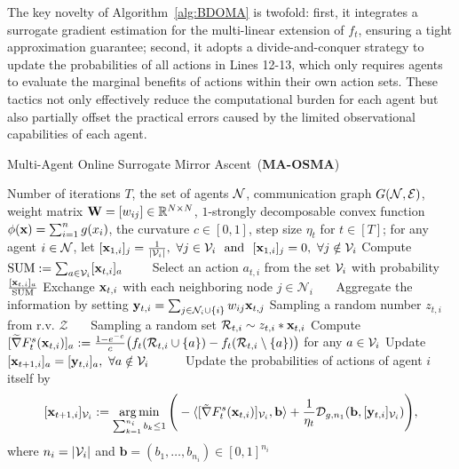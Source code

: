     The key novelty of Algorithm~\ref{alg:BDOMA} is twofold: first, it integrates a surrogate gradient estimation for the multi-linear extension of $f_{t}$, ensuring a tight approximation guarantee; second, it adopts a divide-and-conquer strategy to update the probabilities of all actions in Lines 12-13, which only requires agents to evaluate the marginal benefits of actions within their own action sets. These tactics not only effectively reduce the computational burden for each agent but also partially offset the practical errors caused by the limited observational capabilities of each agent.
     \begin{algorithm}[t]
		\caption{Multi-Agent Online Surrogate Mirror Ascent~(\textbf{MA-OSMA})}\label{alg:BDOMA}
		\begin{algorithmic}[1]
			 Number of iterations $T$, the set of agents $\mathcal{N}$, communication graph $G(\mathcal{N},\mathcal{E})$,
			weight matrix $\mathbf{W}=[w_{ij}]\in\mathbb{R}^{N\times N}$, $1$-strongly decomposable convex function $\phi(\mathbf{x})=\sum_{i=1}^{n}g(x_{i})$, the curvature $c\in[0,1]$, step size $\eta_{t}$ for $t\in[T]$;
			 for any agent $i\in\mathcal{N}$, let $[\mathbf{x}_{1,i}]_{j}=\frac{1}{|\mathcal{V}_{i}|},\ \forall j\in\mathcal{V}_{i}\ \text{ and }\  [\mathbf{x}_{1,i}]_{j}=0,\ \forall j\notin\mathcal{V}_{i}$
			\STATE Compute $\text{SUM}:=\sum_{a\in\mathcal{V}_{i}}[\mathbf{x}_{t,i}]_{a}$\ \ \ \  
			\STATE Select an action $a_{t,i}$ from the set $\mathcal{V}_{i}$ with probability $\frac{[\mathbf{x}_{t,i}]_{a}}{\text{SUM}}$
			\STATE Exchange $\mathbf{x}_{t,i}$ with each neighboring node $j\in\mathcal{N}_{i}$\ \ \ 
			\STATE Aggregate the information by setting $ \mathbf{y}_{t,i}=\sum_{j\in\mathcal{N}_{i}\cup\{i\}}w_{ij}\mathbf{x}_{t,j}$%
			\STATE Sampling a random number $z_{t,i}$ from r.v. $\mathcal{Z}$\ \ \ 
			\STATE Sampling a random set $\mathcal{R}_{t,i}\sim z_{t,i}*\mathbf{x}_{t,i}$
			\STATE Compute $[\widetilde{\nabla} F_{t}^{s}(\mathbf{x}_{t,i})]_{a}:=\frac{1-e^{-c}}{c} \big(f_{t}(\mathcal{R}_{t,i}\cup\{a\})-f_{t}(\mathcal{R}_{t,i}\setminus\{a\})\big)$ for any $a\in\mathcal{V}_{i}$ 
			\STATE Update $	[\mathbf{x}_{t+1,i}]_{a}=[\mathbf{y}_{t,i}]_{a},\ \forall a\notin\mathcal{V}_{i}$\ \ \ \ \ 
			\STATE Update the probabilities of actions of agent $i$ itself  by 
			\begin{equation}\label{equ:mirror_projection}
				[\mathbf{x}_{t+1,i}]_{\mathcal{V}_{i}}:=\mathop{\arg\min}_{\sum_{k=1}^{n_{i}}b_{k}\le1}\Bigg(-\langle[\tilde{\nabla} F_{t}^{s}(\mathbf{x}_{t,i})]_{\mathcal{V}_{i}},\mathbf{b}\rangle+\frac{1}{\eta_{t}}\mathcal{D}_{g,n_{1}}(\mathbf{b}, [\mathbf{y}_{t,i}]_{\mathcal{V}_{i}})\Bigg),
			\end{equation} where $n_{i}=|\mathcal{V}_{i}|$ and $\mathbf{b}=(b_{1},\dots,b_{n_{i}})\in[0,1]^{n_{i}}$
			\ENDFOR
			\ENDFOR
		\end{algorithmic}
	\end{algorithm}	
